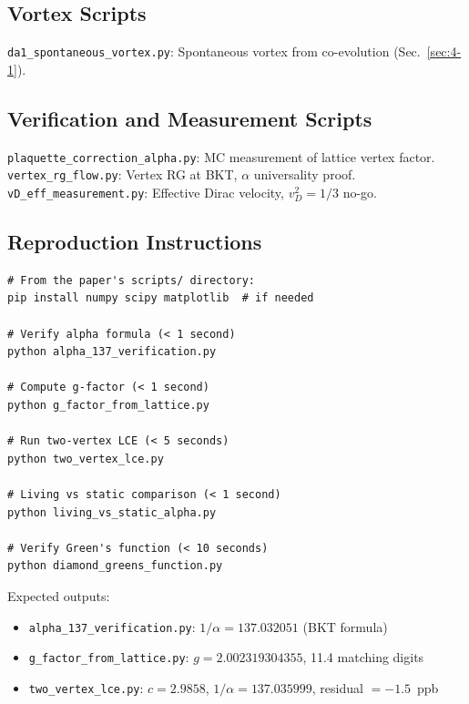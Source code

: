 \documentclass[aps,prd,onecolumn,superscriptaddress,floatfix,12pt]{revtex4-2}
\begin{document}
\subsection{Vortex Scripts}

\texttt{da1\_spontaneous\_vortex.py}: Spontaneous vortex from co-evolution (Sec.~\ref{sec:4-1}).

\subsection{Verification and Measurement Scripts}

\texttt{plaquette\_correction\_alpha.py}: MC measurement of lattice vertex factor.\\
\texttt{vertex\_rg\_flow.py}: Vertex RG at BKT, $\alpha$ universality proof.\\
\texttt{vD\_eff\_measurement.py}: Effective Dirac velocity, $v_D^2 = 1/3$ no-go.

\subsection{Reproduction Instructions}

\begin{verbatim}
# From the paper's scripts/ directory:
pip install numpy scipy matplotlib  # if needed

# Verify alpha formula (< 1 second)
python alpha_137_verification.py

# Compute g-factor (< 1 second)
python g_factor_from_lattice.py

# Run two-vertex LCE (< 5 seconds)
python two_vertex_lce.py

# Living vs static comparison (< 1 second)
python living_vs_static_alpha.py

# Verify Green's function (< 10 seconds)
python diamond_greens_function.py
\end{verbatim}

Expected outputs:
\begin{itemize}
\item \texttt{alpha\_137\_verification.py}: $1/\alpha = 137.032051$ (BKT formula)
\item \texttt{g\_factor\_from\_lattice.py}: $g = 2.002319304355$, 11.4 matching digits
\item \texttt{two\_vertex\_lce.py}: $c = 2.9858$, $1/\alpha = 137.035999$, residual $= -1.5$~ppb
\end{itemize}


\end{document}
